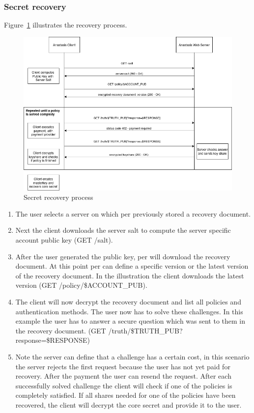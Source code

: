 \subsubsection{Secret recovery}

Figure~\ref{fig:recovery_process} illustrates the recovery process.
\begin{figure}[H]
	\centering
		\includegraphics[scale=0.5]{images/recovery_process.png}
	\caption{Secret recovery process}
	\label{fig:recovery_process}
\end{figure}
\begin{enumerate}
\item The user selects a server on which per previously stored a
  recovery document.
\item Next the client downloads the server salt to compute the server
  specific account public key (GET /salt).
\item After the user generated the public key, per will download the
  recovery document. At this point per can define a
  specific version or the latest version of the recovery document. In
  the illustration the client downloads the latest version (GET
  /policy/\$ACCOUNT\_PUB).
\item The client will now decrypt the recovery document and list all
  policies and authentication methods. The user now has to solve these
  challenges. In this example the user has to answer a secure question
  which was sent to them in the recovery document. (GET
  /truth/\$TRUTH\_PUB?response=\$RESPONSE) \\
\item Note the server can define that a challenge has a certain cost,
  in this scenario the server rejects the first request because the
  user has not yet paid for recovery.  After the payment the user can
  resend the request.  After each successfully solved challenge the
  client will check if one of the policies is completely satisfied.
  If all shares needed for one of the policies have been recovered,
  the client will decrypt the core secret and provide it to the user.
\end{enumerate}

